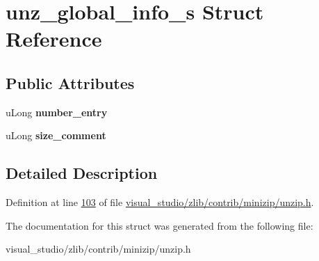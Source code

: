 \hypertarget{structunz__global__info__s}{}\section{unz\+\_\+global\+\_\+info\+\_\+s Struct Reference}
\label{structunz__global__info__s}
\subsection*{Public Attributes}
\begin{DoxyCompactItemize}
\item 
\mbox{\label{structunz__global__info__s_a827d1cd1d09f12acd6c2ee12494cb320}} 
u\+Long {\bfseries number\+\_\+entry}
\item 
\mbox{\label{structunz__global__info__s_a10b58ab57b62301de813ecac0e974363}} 
u\+Long {\bfseries size\+\_\+comment}
\end{DoxyCompactItemize}


\subsection{Detailed Description}


Definition at line \hyperlink{visual__studio_2zlib_2contrib_2minizip_2unzip_8h_source_l00103}{103} of file \hyperlink{visual__studio_2zlib_2contrib_2minizip_2unzip_8h_source}{visual\+\_\+studio/zlib/contrib/minizip/unzip.\+h}.



The documentation for this struct was generated from the following file\+:\begin{DoxyCompactItemize}
\item 
visual\+\_\+studio/zlib/contrib/minizip/unzip.\+h\end{DoxyCompactItemize}
